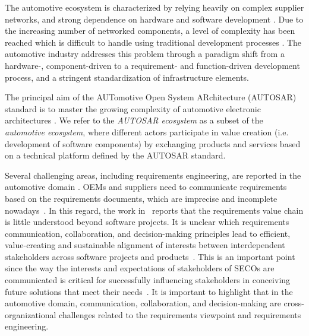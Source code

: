 The automotive ecosystem is characterized by relying heavily on complex supplier networks, and strong dependence on hardware and software development \cite {knauss2014towards}.
Due to the increasing number of networked components, a level of complexity has been reached which is difficult to handle using traditional development processes \cite{fennel2006achievements}. 
The automotive industry addresses this problem through a paradigm shift from a hardware-, component-driven to a requirement- and function-driven development process, and a stringent standardization of infrastructure elements. %

The principal aim of the AUTomotive Open System ARchitecture (AUTOSAR) standard is to master the growing complexity of automotive electronic architectures \cite{furst2009autosar}.
We refer to the \emph{AUTOSAR ecosystem} as a subset of the \emph{automotive ecosystem}, where different actors participate in value creation (i.e. development of software components) by exchanging products and services based on a technical platform defined by the AUTOSAR standard. %

Several challenging areas, including requirements engineering, are reported in the automotive domain \cite{broy2006challenges}.
OEMs and suppliers need to communicate requirements based on the requirements documents, which are imprecise and incomplete nowadays~\cite{broy2006challenges}.
In this regard, the work in~\cite{fricker2010requirements} reports that the requirements value chain is little understood beyond software projects. 
It is unclear which requirements communication, collaboration, and decision-making principles lead to efficient, value-creating and sustainable alignment of interests between interdependent stakeholders across software projects and products~\cite{fricker2010requirements}. 
This is an important point since the way the interests and expectations of stakeholders of SECOs are communicated is critical for successfully influencing stakeholders in conceiving future solutions that meet their needs~\cite{fricker2009specification}. 
It is important to highlight that in the automotive domain, communication, collaboration, and decision-making are cross-organizational challenges related to the requirements viewpoint and requirements engineering.


